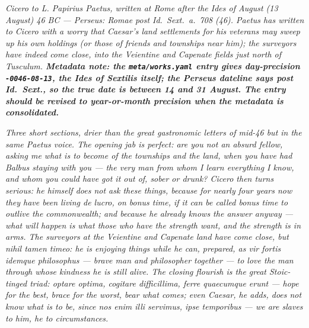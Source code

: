 
\textit{Cicero to L. Papirius Paetus, written at Rome after the Ides
of August (13 August) 46 BC --- Perseus: \textit{Romae post Id.~Sext.~a.~708 (46)}. Paetus has written to Cicero with a worry that
Caesar's land settlements for his veterans may sweep up his own
holdings (or those of friends and townships near him); the surveyors
have indeed come close, into the Veientine and Capenate fields just
north of Tusculum. \textbf{Metadata note: the \texttt{meta/works.yaml}
entry gives day-precision \texttt{-0046-08-13}, the Ides of Sextilis
itself; the Perseus dateline says \textit{post Id.~Sext.}, so the
true date is between 14 and 31 August. The entry should be revised to
year-or-month precision when the metadata is consolidated.}}

\textit{Three short sections, drier than the great gastronomic
letters of mid-46 but in the same Paetus voice. The opening jab is
perfect: are you not an absurd fellow, asking me what is to become of
the townships and the land, when you have had Balbus staying with
you --- the very man from whom I learn everything I know, and whom you
could have got it out of, sober or drunk? Cicero then turns serious:
he himself does not ask these things, because for nearly four years
now they have been living \textit{de lucro}, on bonus time, if it can
be called bonus time to outlive the commonwealth; and because he
already knows the answer anyway --- what will happen is what those
who have the strength want, and the strength is in arms. The
surveyors at the Veientine and Capenate land have come close, but
\textit{nihil tamen timeo}: he is enjoying things while he can,
prepared, as \textit{vir fortis idemque philosophus} --- brave man
and philosopher together --- to love the man through whose kindness
he is still alive. The closing flourish is the great Stoic-tinged
triad: \textit{optare optima, cogitare difficillima, ferre quaecumque
erunt} --- hope for the best, brace for the worst, bear what comes;
even Caesar, he adds, does not know what is to be, since
\textit{nos enim illi servimus, ipse temporibus} --- we are slaves to
him, he to circumstances.}
